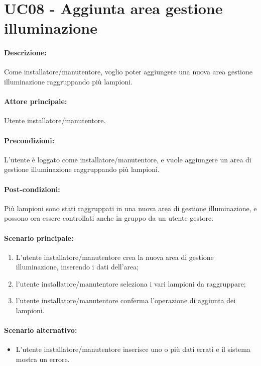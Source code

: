 \section{UC08 - Aggiunta area gestione illuminazione}

\paragraph{Descrizione:}
Come installatore/manutentore, voglio poter aggiungere una nuova area gestione illuminazione raggruppando più lampioni.

\paragraph{Attore principale:}
Utente installatore/manutentore.

\paragraph{Precondizioni:}
L'utente è loggato come installatore/manutentore, e vuole aggiungere un area di gestione illuminazione raggruppando più lampioni.

\paragraph{Post-condizioni:}
Più lampioni sono stati raggruppati in una nuova area di gestione illuminazione, e possono ora essere controllati anche in gruppo da un utente gestore.

\paragraph{Scenario principale:}
\begin{enumerate}
    \item L'utente installatore/manutentore crea la nuova area di gestione illuminazione, inserendo i dati dell'area;
    \item l'utente installatore/manutentore seleziona i vari lampioni da raggruppare;
    \item l'utente installatore/manutentore conferma l'operazione di aggiunta dei lampioni.
\end{enumerate}

\paragraph{Scenario alternativo:}
\begin{itemize}
    \item L'utente installatore/manutentore inserisce uno o più dati errati e il sistema mostra un errore.
\end{itemize}
